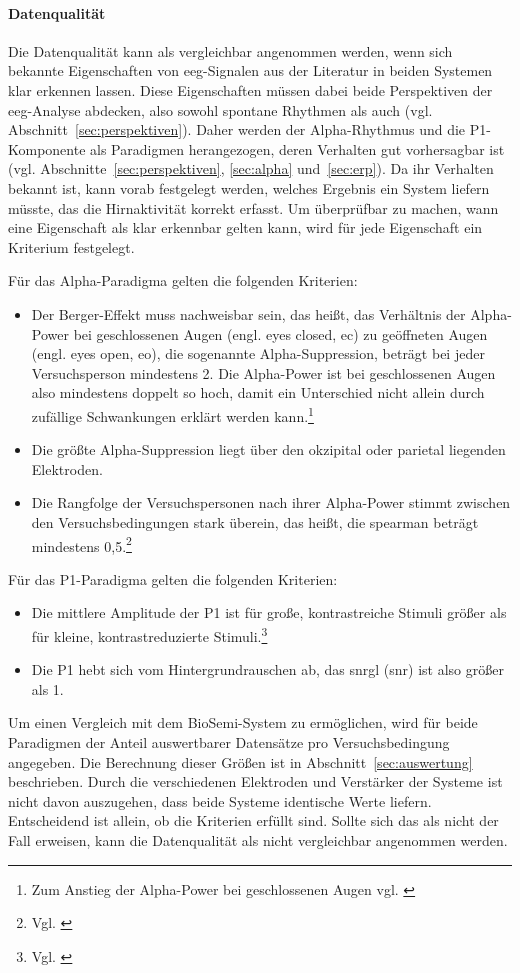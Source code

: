 \paragraph{Datenqualität} Die Datenqualität kann als vergleichbar angenommen werden, wenn sich bekannte Eigenschaften von \acrshort{eeg}-Signalen aus der Literatur in beiden Systemen klar erkennen lassen. Diese Eigenschaften müssen dabei beide Perspektiven der \acrshort{eeg}-Analyse abdecken, also sowohl spontane Rhythmen als auch  (vgl. Abschnitt~\ref{sec:perspektiven}). Daher werden der Alpha-Rhythmus und die P1-Komponente als Paradigmen herangezogen, deren Verhalten gut vorhersagbar ist (vgl. Abschnitte~\ref{sec:perspektiven}, \ref{sec:alpha} und~\ref{sec:erp}). Da ihr Verhalten bekannt ist, kann vorab festgelegt werden, welches Ergebnis ein System liefern müsste, das die Hirnaktivität korrekt erfasst. Um überprüfbar zu machen, wann eine Eigenschaft als klar erkennbar gelten kann, wird für jede Eigenschaft ein Kriterium festgelegt.

Für das Alpha-Paradigma gelten die folgenden Kriterien:
\begin{itemize}
    \item Der Berger-Effekt muss nachweisbar sein, das heißt, das Verhältnis der Alpha-Power bei geschlossenen Augen (engl. eyes closed, \acrshort{ec}) zu geöffneten Augen (engl. eyes open, \acrshort{eo}), die sogenannte Alpha-Suppression, beträgt bei jeder Versuchsperson mindestens 2. Die Alpha-Power ist bei geschlossenen Augen also mindestens doppelt so hoch, damit ein Unterschied nicht allein durch zufällige Schwankungen erklärt werden kann.\footnote{Zum Anstieg der Alpha-Power bei geschlossenen Augen vgl. \cite[S.~2765--2773]{barry2007}}
    \item Die größte Alpha-Suppression liegt über den okzipital oder parietal liegenden Elektroden.
    \item Die Rangfolge der Versuchspersonen nach ihrer Alpha-Power stimmt zwischen den Versuchsbedingungen stark überein, das heißt, die \gls{spearman} beträgt mindestens 0,5.\footnote{Vgl. \cite[S.~4]{brydges2019_effectsize}}
\end{itemize}

Für das P1-Paradigma gelten die folgenden Kriterien:
\begin{itemize}
    \item Die mittlere Amplitude der P1 ist für große, kontrastreiche Stimuli größer als für kleine, kontrastreduzierte Stimuli.\footnote{Vgl. \cite[S.~36]{luck2005}}
    \item Die P1 hebt sich vom Hintergrundrauschen ab, das \gls{snrgl} (\acrshort{snr}) ist also größer als 1.
\end{itemize}
Um einen Vergleich mit dem BioSemi-System zu ermöglichen, wird für beide Paradigmen der Anteil auswertbarer Datensätze pro Versuchsbedingung angegeben. Die Berechnung dieser Größen ist in Abschnitt~\ref{sec:auswertung} beschrieben. Durch die verschiedenen Elektroden und Verstärker der Systeme ist nicht davon auszugehen, dass beide Systeme identische Werte liefern. Entscheidend ist allein, ob die Kriterien erfüllt sind. Sollte sich das als nicht der Fall erweisen, kann die Datenqualität als nicht vergleichbar angenommen werden.

